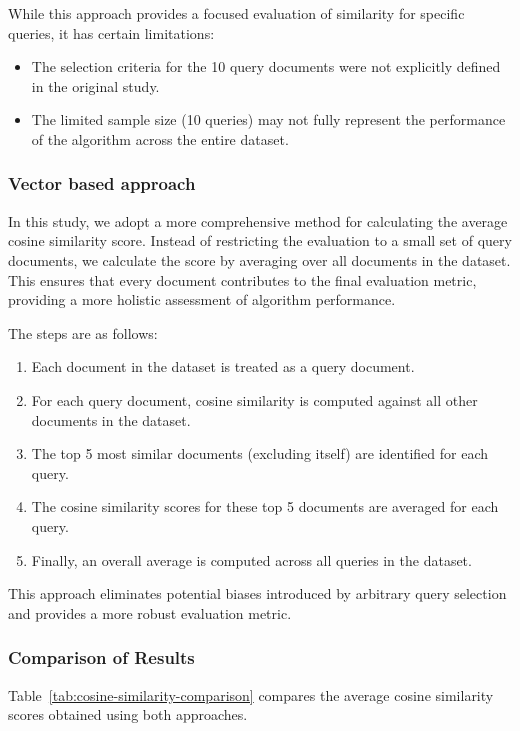 \documentclass[12pt]{article}
\begin{document}
While this approach provides a focused evaluation of similarity for specific queries, it has certain limitations:
\begin{itemize}
    \item The selection criteria for the 10 query documents were not explicitly defined in the original study.
    \item The limited sample size (10 queries) may not fully represent the performance of the algorithm across the entire dataset.
\end{itemize}

\subsubsection{Vector based approach}

In this study, we adopt a more comprehensive method for calculating the average cosine similarity score. Instead of restricting the evaluation to a small set of query documents, we calculate the score by averaging over all documents in the dataset. This ensures that every document contributes to the final evaluation metric, providing a more holistic assessment of algorithm performance.

The steps are as follows:
\begin{enumerate}
    \item Each document in the dataset is treated as a query document.
    \item For each query document, cosine similarity is computed against all other documents in the dataset.
    \item The top 5 most similar documents (excluding itself) are identified for each query.
    \item The cosine similarity scores for these top 5 documents are averaged for each query.
    \item Finally, an overall average is computed across all queries in the dataset.
\end{enumerate}


This approach eliminates potential biases introduced by arbitrary query selection and provides a more robust evaluation metric.

\subsubsection{Comparison of Results}

Table~\ref{tab:cosine-similarity-comparison} compares the average cosine similarity scores obtained using both approaches.
\end{document}
